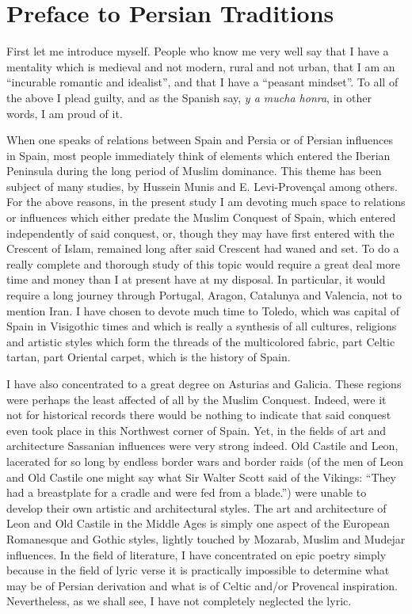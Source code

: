 \section{Preface to Persian Traditions}

First let me introduce myself. People who know me very well say that I have a mentality which is medieval and not modern, rural and not urban, that I am an ``incurable romantic and idealist'', and that I have a ``peasant mindset''. To all of the above I plead guilty, and as the Spanish say, \emph{y a mucha honra}, in other words, I am proud of it.

When one speaks of relations between Spain and Persia or of Persian influences in Spain, most people immediately think of elements which entered the Iberian Peninsula during the long period of Muslim dominance. This theme has been subject of many studies, by Hussein Munis and E. Levi-Provençal among others. For the above reasons, in the present study I am devoting much space to relations or influences which either predate the Muslim Conquest of Spain, which entered independently of said conquest, or, though they may have first entered with the Crescent of Islam, remained long after said Crescent had waned and set. To do a really complete and thorough study of this topic would require a great deal more time and money than I at present have at my disposal. In particular, it would require a long journey through Portugal, Aragon, Catalunya and Valencia, not to mention Iran. I have chosen to devote much time to Toledo, which was capital of Spain in Visigothic times and which is really a synthesis of all cultures, religions and artistic styles which form the threads of the multicolored fabric, part Celtic tartan, part Oriental carpet, which is the history of Spain.

I have also concentrated to a great degree on Asturias and Galicia. These regions were perhaps the least affected of all by the Muslim Conquest. Indeed, were it not for historical records there would be nothing to indicate that said conquest even took place in this Northwest corner of Spain. Yet, in the fields of art and architecture Sassanian influences were very strong indeed. Old Castile and Leon, lacerated for so long by endless border wars and border raids (of the men of Leon and Old Castile one might say what Sir Walter Scott said of the Vikings: ``They had a breastplate for a cradle and were fed from a blade.'') were unable to develop their own artistic and architectural styles. The art and architecture of Leon and Old Castile in the Middle Ages is simply one aspect of the European Romanesque and Gothic styles, lightly touched by Mozarab, Muslim and Mudejar influences. In the field of literature, I have concentrated on epic poetry simply because in the field of lyric verse it is practically impossible to determine what may be of Persian derivation and what is of Celtic and/or Provencal inspiration. Nevertheless, as we shall see, I have not completely neglected the lyric.

